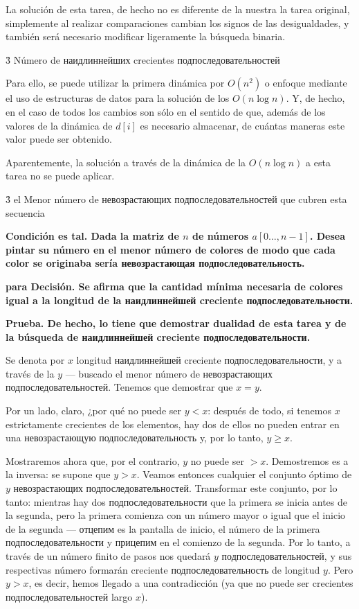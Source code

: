 La solución de esta tarea, de hecho no es diferente de la nuestra la tarea original, simplemente al realizar comparaciones cambian los signos de las desigualdades, y también será necesario modificar ligeramente la búsqueda binaria.


\h3{ Número de наидлиннейших crecientes подпоследовательностей }

Para ello, se puede utilizar la primera dinámica por $O (n^2)$ o enfoque mediante el uso de estructuras de datos para la solución de los $O (n \log n)$. Y, de hecho, en el caso de todos los cambios son sólo en el sentido de que, además de los valores de la dinámica de $d[i]$ es necesario almacenar, de cuántas maneras este valor puede ser obtenido.

Aparentemente, la solución a través de la dinámica de la $O (n \log n)$ a esta tarea no se puede aplicar.


\h3{ el Menor número de невозрастающих подпоследовательностей que cubren esta secuencia }

\bf{Condición} es tal. Dada la matriz de $n$ de números $a[0 \ldots, n-1]$. Desea pintar su número en el menor número de colores de modo que cada color se originaba sería невозрастающая подпоследовательность.

\bf{para Decisión}. Se afirma que la cantidad mínima necesaria de colores igual a la longitud de la наидлиннейшей creciente подпоследовательности.

\bf{Prueba}. De hecho, lo tiene que demostrar \bf{dualidad} de esta tarea y de la búsqueda de наидлиннейшей creciente подпоследовательности.

Se denota por $x$ longitud наидлиннейшей creciente подпоследовательности, y a través de la $y$ --- buscado el menor número de невозрастающих подпоследовательностей. Tenemos que demostrar que $x=y$.

Por un lado, claro, ¿por qué no puede ser $y<x$: después de todo, si tenemos $x$ estrictamente crecientes de los elementos, hay dos de ellos no pueden entrar en una невозрастающую подпоследовательность y, por lo tanto, $y \ge x$.

Mostraremos ahora que, por el contrario, $y$ no puede ser $> x$. Demostremos es a la inversa: se supone que $y > x$. Veamos entonces cualquier el conjunto óptimo de $y$ невозрастающих подпоследовательностей. Transformar este conjunto, por lo tanto: mientras hay dos подпоследовательности que la primera se inicia antes de la segunda, pero la primera comienza con un número mayor o igual que el inicio de la segunda --- отцепим es la pantalla de inicio, el número de la primera подпоследовательности y прицепим en el comienzo de la segunda. Por lo tanto, a través de un número finito de pasos nos quedará $y$ подпоследовательностей, y sus respectivas número formarán creciente подпоследовательность de longitud $y$. Pero $y > x$, es decir, hemos llegado a una contradicción (ya que no puede ser crecientes подпоследовательностей largo $x$).

